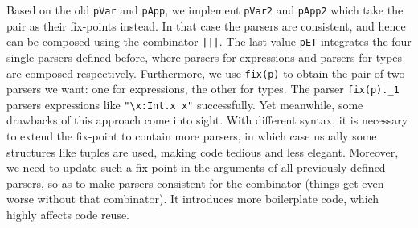Based on the old \lstinline{pVar} and \lstinline{pApp}, we implement \lstinline{pVar2} and \lstinline{pApp2} which take the pair as their fix-points instead.
In that case the parsers are consistent, and hence can be composed using the combinator \lstinline{|||}.
The last value \lstinline{pET} integrates the four single parsers defined before, where parsers for expressions and parsers for types are composed respectively. Furthermore, we use \lstinline{fix(p)} to obtain the pair of two parsers we want: one for expressions, the other for types. The parser \lstinline{fix(p)._1} parsers expressions like \lstinline{"\x:Int.x x"} successfully. Yet meanwhile, some drawbacks of this approach come into sight. With different syntax, it
is necessary to extend the fix-point to contain more parsers, in which case usually some structures like tuples are used,
making code tedious and less elegant. Moreover, we need to update such a fix-point in the arguments of all previously defined parsers, so as to make parsers consistent for the combinator (things get even worse without that combinator). It introduces more boilerplate code, which highly affects code reuse.

